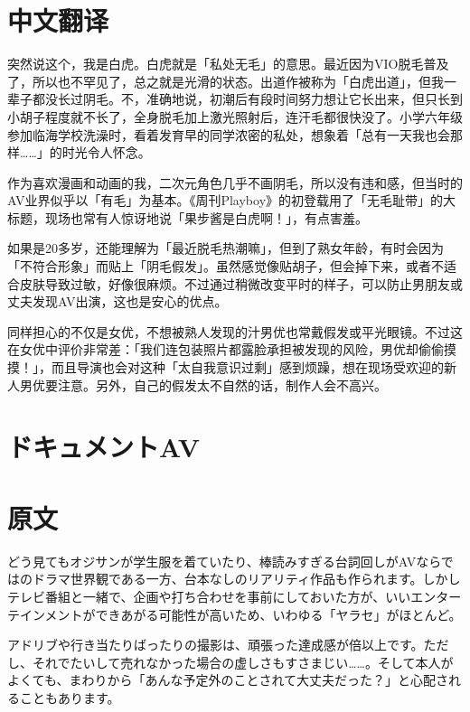 \documentclass[12pt,UTF8]{ctexbook}
\begin{document}
\section*{中文翻译}

突然说这个，我是白虎。白虎就是「私处无毛」的意思。最近因为VIO脱毛普及了，所以也不罕见了，总之就是光滑的状态。出道作被称为「白虎出道」，但我一辈子都没长过阴毛。不，准确地说，初潮后有段时间努力想让它长出来，但只长到小胡子程度就不长了，全身脱毛加上激光照射后，连汗毛都很快没了。小学六年级参加临海学校洗澡时，看着发育早的同学浓密的私处，想象着「总有一天我也会那样……」的时光令人怀念。

作为喜欢漫画和动画的我，二次元角色几乎不画阴毛，所以没有违和感，但当时的AV业界似乎以「有毛」为基本。《周刊Playboy》的初登载用了「无毛耻带」的大标题，现场也常有人惊讶地说「果步酱是白虎啊！」，有点害羞。

如果是20多岁，还能理解为「最近脱毛热潮嘛」，但到了熟女年龄，有时会因为「不符合形象」而贴上「阴毛假发」。虽然感觉像贴胡子，但会掉下来，或者不适合皮肤导致过敏，好像很麻烦。不过通过稍微改变平时的样子，可以防止男朋友或丈夫发现AV出演，这也是安心的优点。

同样担心的不仅是女优，不想被熟人发现的汁男优也常戴假发或平光眼镜。不过这在女优中评价非常差：「我们连包装照片都露脸承担被发现的风险，男优却偷偷摸摸！」，而且导演也会对这种「太自我意识过剩」感到烦躁，想在现场受欢迎的新人男优要注意。另外，自己的假发太不自然的话，制作人会不高兴。

\switchcolumn

\section{ドキュメントAV}

\switchcolumn

\section*{原文}

どう見てもオジサンが学生服を着ていたり、棒読みすぎる台詞回しがAVならではのドラマ世界観である一方、台本なしのリアリティ作品も作られます。しかしテレビ番組と一緒で、企画や打ち合わせを事前にしておいた方が、いいエンターテインメントができあがる可能性が高いため、いわゆる「ヤラセ」がほとんど。

アドリブや行き当たりばったりの撮影は、頑張った達成感が倍以上です。ただし、それでたいして売れなかった場合の虚しさもすさまじい……。そして本人がよくても、まわりから「あんな予定外のことされて大丈夫だった？」と心配されることもあります。
\end{document}
